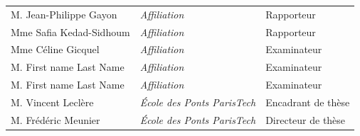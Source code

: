 \begin{tabular}{lll}
{\Large M. Jean-Philippe  {\sc Gayon}} & {\large{\it Affiliation}} & {\large Rapporteur}\\[0.5ex]
{\Large Mme Safia         {\sc Kedad-Sidhoum}} & {\large{\it Affiliation}} & {\large Rapporteur}\\[0.5ex]
{\Large Mme C\'eline      {\sc Gicquel}} & {\large{\it Affiliation}} & {\large Examinateur}\\[0.5ex]
{\Large M. First name     {\sc Last Name}} & {\large{\it Affiliation}} & {\large Examinateur}\\[0.5ex]
{\Large M. First name     {\sc Last Name}} & {\large{\it Affiliation}} & {\large Examinateur}\\[0.5ex]
{\Large M. Vincent        {\sc Lecl\`ere}} & {\large{\it \'Ecole des Ponts ParisTech}} & {\large Encadrant de th\`ese}\\[0.5ex]
{\Large M. Fr\'ed\'eric   {\sc Meunier}} & {\large{\it \'Ecole des Ponts ParisTech}} & {\large Directeur de th\`ese}

\end{tabular}
